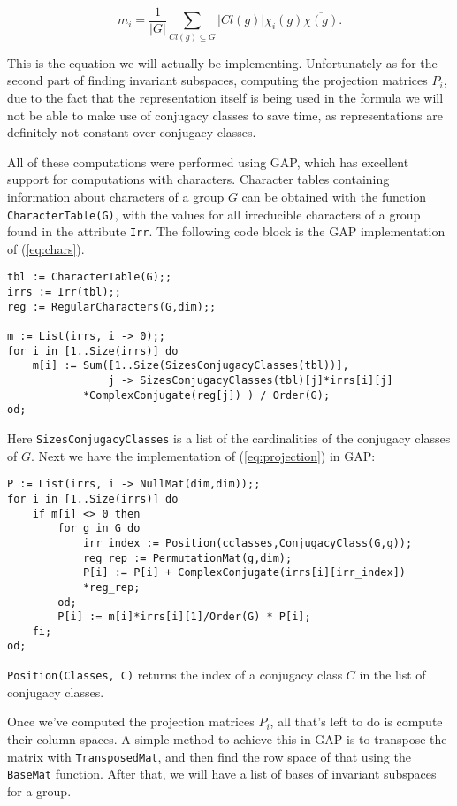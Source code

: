 \documentclass[11pt]{article} %
\theoremstyle{definition}
\theoremstyle{remark}
\newcommand{\code}[1]{\texttt{#1}}
\begin{document}
\begin{equation} \label{eq:chars}
m_i = \frac{1}{|G|} \sum_{Cl(g) \subseteq G} |Cl(g)| \chi_i(g) \overline{\chi(g)}.
\end{equation}

This is the equation we will actually be implementing. Unfortunately as for the second part of finding invariant subspaces, computing the projection matrices $P_i$, due to the fact that the representation itself is being used in the formula we will not be able to make use of conjugacy classes to save time, as representations are definitely not constant over conjugacy classes.

All of these computations were performed using GAP, which has excellent support for computations with characters. Character tables containing information about characters of a group $G$ can be obtained with the function \code{CharacterTable(G)}, with the values for all irreducible characters of a group found in the attribute \code{Irr}. The following code block is the GAP implementation of (\ref{eq:chars}).

\begin{lstlisting}[frame = single]
tbl := CharacterTable(G);;
irrs := Irr(tbl);;
reg := RegularCharacters(G,dim);;

m := List(irrs, i -> 0);;
for i in [1..Size(irrs)] do
    m[i] := Sum([1..Size(SizesConjugacyClasses(tbl))],
                j -> SizesConjugacyClasses(tbl)[j]*irrs[i][j]
		    *ComplexConjugate(reg[j]) ) / Order(G);
od;
\end{lstlisting}

Here \code{SizesConjugacyClasses} is a list of the cardinalities of the conjugacy classes of $G$. Next we have the implementation of (\ref{eq:projection}) in GAP:

\begin{lstlisting}[frame = single]
P := List(irrs, i -> NullMat(dim,dim));;
for i in [1..Size(irrs)] do
    if m[i] <> 0 then
        for g in G do
            irr_index := Position(cclasses,ConjugacyClass(G,g));
            reg_rep := PermutationMat(g,dim);
            P[i] := P[i] + ComplexConjugate(irrs[i][irr_index])
			*reg_rep;
        od;
        P[i] := m[i]*irrs[i][1]/Order(G) * P[i];
    fi;
od;
\end{lstlisting}

\code{Position(Classes, C)} returns the index of a conjugacy class $C$ in the list of conjugacy classes.

Once we've computed the projection matrices $P_i$, all that's left to do is compute their column spaces. A simple method to achieve this in GAP is to transpose the matrix with \code{TransposedMat}, and then find the row space of that using the \code{BaseMat} function. After that, we will have a list of bases of invariant subspaces for a group.
\end{document}
